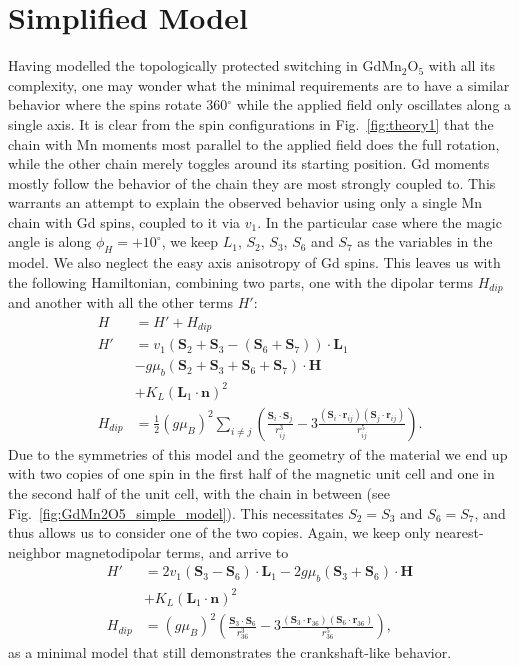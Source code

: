 \section{Simplified Model}
Having modelled the topologically protected switching in  GdMn$_2$O$_5$ with all its complexity, one may wonder what the minimal requirements are to have a similar behavior where the spins rotate 360$^\circ$ while the applied field only oscillates along a single axis.
It is clear from the spin configurations in Fig.~\ref{fig:theory1} that the chain with Mn moments most parallel to the applied field does the full rotation, while the other chain merely toggles around its starting position. Gd moments mostly follow the behavior of the chain they are most strongly coupled to. This warrants an attempt to explain the observed behavior using only a single Mn chain with Gd spins, coupled to it via $v_1$. 
In the particular case where the magic angle is along $\phi_H = +10^\circ$, we keep $L_1$, $S_2$, $S_3$, $
S_6$ and $S_7$ as the variables in the model. We also neglect the easy axis anisotropy of Gd spins.
This leaves us with the following Hamiltonian, combining two parts, one with the dipolar terms $H_{dip}$ and another with all the other terms $H'$:
\begin{align}
	H &= H' + H_{dip} \\
	H' &= v_1(\mathbf{S}_2 + \mathbf{S}_3 - (\mathbf{S}_6 + \mathbf{S}_7))\cdot\mathbf{L}_1 \nonumber\\
	&- g \mu_b (\mathbf{S}_2 + \mathbf{S}_3 + \mathbf{S}_6 + \mathbf{S}_7) \cdot \mathbf{H} \nonumber\\
	&+ K_L (\mathbf{L}_1 \cdot \mathbf{n})^2 \nonumber\\
	H_{dip} &= \frac{1}{2}(g \mu_B)^2\sum_{i\neq j}\left(\frac{\mathbf{S}_i\cdot \mathbf{S}_j}{r_{ij}^
3}-3\frac{(\mathbf{S}_i\cdot \mathbf{r}_{ij})(\mathbf{S}_j\cdot \mathbf{r}_{ij})}{r_{ij}^5}\right)\nonumber.
\end{align}
Due to the symmetries of this model and the geometry of the material we end up with two copies of one spin in the first half of the magnetic unit cell and one in the second half of the unit cell, with the chain in between (see Fig.~\ref{fig:GdMn2O5_simple_model}).
This necessitates $S_2 = S_3$ and $S_6 = S_7$, and thus allows us to consider one of the two copies. Again, we keep only nearest-neighbor magnetodipolar terms, and arrive to
\begin{align}
	H' &= 2v_1(\mathbf{S}_3 - \mathbf{S}_6)\cdot\mathbf{L}_1 - 2g \mu_b (\mathbf{S}_3 + \mathbf{S}_6) 
\cdot \mathbf{H} \\
	&+ K_L (\mathbf{L}_1 \cdot \mathbf{n})^2 \nonumber\\
	H_{dip} &= (g \mu_B)^2\left(\frac{\mathbf{S}_3\cdot \mathbf{S}_6}{r_{36}^3}-3\frac{(\mathbf{S}_3\cdot \mathbf{r}_{36})(\mathbf{S}_6\cdot \mathbf{r}_{36})}{r_{36}^5}\right)\nonumber,
\end{align}
as a minimal model that still demonstrates the crankshaft-like behavior.

